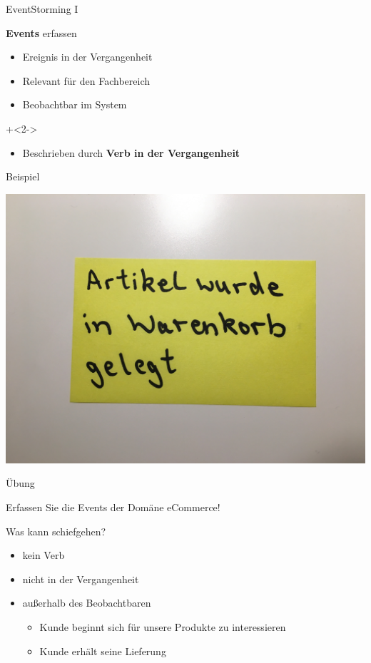 \begin{frame}[fragile]{EventStorming I}

\textbf{Events} erfassen

\begin{itemize}
\item Ereignis in der Vergangenheit
\item Relevant für den Fachbereich
\item Beobachtbar im System
\end{itemize}

\onslide+<2->
\begin{itemize}
\item Beschrieben durch \textbf{Verb in der Vergangenheit}
\end{itemize}

\end{frame}

\begin{frame}[fragile]{Beispiel}

\begin{center}
\includegraphics[width=.5\textwidth]{pics/eventstorming1.jpg}
\end{center}

\end{frame}


\begin{frame}[fragile]{Übung}

Erfassen Sie die Events der Domäne \glqq eCommerce\grqq !

\end{frame}


\begin{frame}[fragile]{Was kann schiefgehen?}

\begin{itemize}
\item kein Verb
\item nicht in der Vergangenheit
\item außerhalb des Beobachtbaren
\begin{itemize}
\item Kunde beginnt sich für unsere Produkte zu interessieren
\item Kunde erhält seine Lieferung
\end{itemize}
\end{itemize}

\end{frame}


